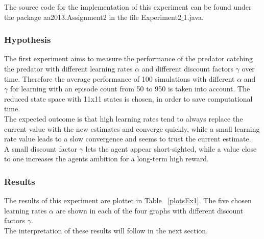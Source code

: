 \documentclass[11pt]{article}
\begin{document}
The source code for the implementation of this experiment can be found under the package aa2013.Assignment2 in the file Experiment2$\_$1.java.
\subsubsection{Hypothesis}
The first experiment aims to measure the performance of the predator catching the predator with different learning rates $\alpha$ and different discount factors $\gamma$ over time. Therefore the average performance of 100 simulations with different $\alpha$ and $\gamma$ for learning with an episode count from 50 to 950 is  taken into account. The reduced state space  with 11x11 states is chosen, in order to save computational time.\\
The expected outcome is that high learning rates tend to always replace the current value with the new estimates and converge quickly, while a small learning rate value leads to a slow convergence and seems to trust the current estimate. ~\cite{dar}\\
A small discount factor $\gamma$ lets the agent appear short-sighted, while a value close to one increases the agents ambition for a long-term high reward.

\subsubsection{Results}
The results of this experiment are plottet in Table ~\ref{plotsEx1}. The five chosen learning rates $\alpha$ are shown in each of the four graphs with different discount factors $\gamma$.\\
The interpretation of these results will follow in the next section.
\end{document}
